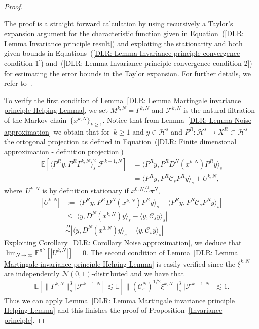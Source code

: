 \begin{proof}
\begin{lemma}
  \end{lemma}
  The proof is a straight forward calculation by using recursively a Taylor's expansion argument for the characteristic function given in Equation~(\ref{DLR: Lemma Invariance principle result}) and exploiting the stationarity and both given bounds in Equations~(\ref{DLR: Lemma Invariance principle convergence condition 1}) and~(\ref{DLR: Lemma Invariance principle convergence condition 2}) for estimating the error bounds in the Taylor expansion. For further details, we refer to~\autocite[Lemma 4.3]{Mattingly2010}.
  
  To verify the first condition of Lemma~\ref{DLR: Lemma Martingale invariance principle Helping Lemma}, we set $M^{k,N} = \Gamma^{k,N} $ and $ \mathcal{F}^{k,N} $ is the natural filtration of the Markov chain~$ \{ x^{k,N} \} _{k \geq 1}$. Notice that from Lemma~\ref{DLR: Lemma Noise approximation} we obtain that for~$k \geq 1$ and $y \in \mathcal{H}^s$ and $P^R :\mathcal{H}^s \to X^R \subset \mathcal{H}^s$ the ortogonal projection as defined in Equation~(\ref{DLR: Finite dimensional approximation - definition projection})
  \begin{align*}
    \mathbb{E}[ \langle P^Ry, P^R \Gamma^{k,N} \rangle_s^2 | \mathcal{F}^{k-1,N}] & = \langle P^Ry,P^R D^N(x^{k,N}) P^R y \rangle_s \\
    & = \langle P^R y, P^R \mathcal{C}_s P^R y \rangle_s + U^{k,N},
  \end{align*}
  where~$U^{k,N}$ is by definition stationary if $ x^{0,N}\stackrel{D}{\sim} \pi^N$,
  \begin{align*}
    |U^{k,N}| & := | \langle P^R y, P^R D^N(x^{k,N}) P^R y \rangle_s  - \langle P^R y, P^R \mathcal{C}_s P^R y \rangle_s  |\\
    & \leq |\langle y,  D^N(x^{k,N}) y \rangle_s  - \langle  y,  \mathcal{C}_s y \rangle_s |\\
    & \stackrel{D}{\sim} |\langle y,  D^N(x^{0,N}) y \rangle_s  - \langle  y,  \mathcal{C}_s y \rangle_s |
  \end{align*}
  Exploiting Corollary~\ref{DLR: Corollary Noise approximation}, we deduce that $ \lim_{N \to \infty}\mathbb{E}^{\pi^N}[|U^{k,N}|]=0 $. The second condition of Lemma~\ref{DLR: Lemma Martingale invariance principle Helping Lemma} is easily verified since the $ \xi^{k,N} $ are independently $\mathcal{N}(0,1)$-distributed and we have that
  \begin{equation*}
    \mathbb{E}[ \| \Gamma^{k,N} \|_s^3  |\mathcal{F}^{k-1,N}] \lesssim \mathbb{E}[ \| (\mathcal{C}_s^N)^{1/2} \xi^{k,N}  \|_s^3  |\mathcal{F}^{k-1,N}] \lesssim 1.
  \end{equation*}
  Thus we can apply Lemma~\ref{DLR: Lemma Martingale invariance principle Helping Lemma} and this finishes the proof of Proposition~\ref{Invariance principle}.



  
\end{proof}

